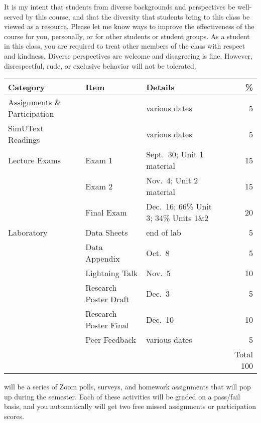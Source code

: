 \documentclass{tufte-handout}
\begin{document}
\begin{fullwidth}
 It is my intent that students from diverse backgrounds and perspectives be well-served by this course, and that the diversity that students bring to this class be viewed as a resource. Please let me know ways to improve the effectiveness of the course for you, personally, or for other students or student groups. As a student in this class, you are required to treat other members of the class with respect and kindness. Diverse perspectives are welcome and disagreeing is fine. However, disrespectful, rude, or exclusive behavior will not be tolerated.


\end{fullwidth}


\begin{fullwidth}

\begin{table}
\begin{tabular}{l l l r}
Category & Item & Details & \% \\
\hline
Assignments \& Participation & & various dates & 5\\
SimUText Readings &  & various dates & 5\\
\hline
Lecture Exams & Exam 1 & Sept.~30; Unit 1 material & 15 \\
& Exam 2 & Nov.~4; Unit 2 material & 15 \\
& Final Exam & Dec.~16; 66\% Unit 3; 34\% Units 1\&2 & 20 \\ 							%
\hline
Laboratory & Data Sheets & end of lab & 5 \\
& Data Appendix & Oct.~8 & 5 \\
& Lightning Talk & Nov.~5 & 10 \\
& Research Poster Draft & Dec.~3 & 5 \\
& Research Poster Final & Dec.~10 & 10 \\
& Peer Feedback & various dates & 5 \\
\hline
& & & Total 100
\end{tabular}
\end{table}



\newpage

 will be a series of Zoom polls, surveys, and homework assignments that will pop up during the semester. Each of these activities will be graded on a pass/fail basis, and you automatically will get two free missed assignments or participation scores. 

\end{fullwidth}
\end{document}
